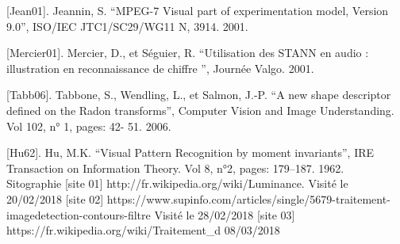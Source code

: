 [Jean01]. Jeannin, S. “MPEG-7 Visual part of experimentation model, Version 9.0”, ISO/IEC
JTC1/SC29/WG11 N, 3914. 2001.

[Mercier01]. Mercier, D., et Séguier, R. “Utilisation des STANN en audio : illustration en reconnaissance de chiffre ”, Journée Valgo. 2001.

[Tabb06]. Tabbone, S., Wendling, L., et Salmon, J.-P. “A new shape descriptor defined on the
Radon transforms”, Computer Vision and Image Understanding. Vol 102, n° 1, pages: 42-
51. 2006.

[Hu62]. Hu, M.K. “Visual Pattern Recognition by moment invariants”, IRE Transaction on
Information Theory. Vol 8, n°2, pages: 179–187. 1962.\\


Sitographie
[site 01] http://fr.wikipedia.org/wiki/Luminance. Visité le 20/02/2018
[site 02] https://www.supinfo.com/articles/single/5679-traitement-imagedetection-contours-filtre Visité le 28/02/2018
[site 03] https://fr.wikipedia.org/wiki/Traitement_d%
08/03/2018